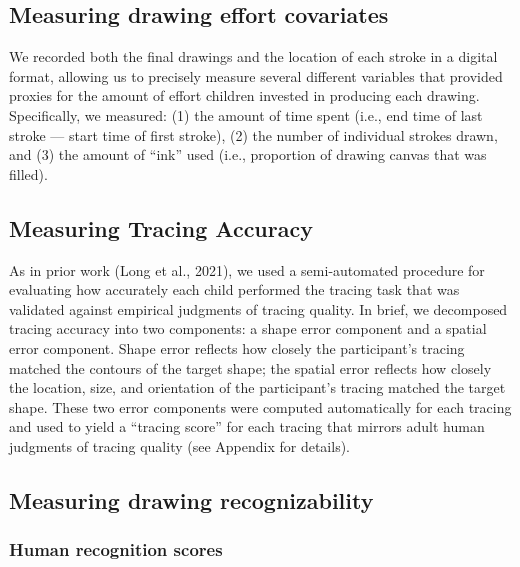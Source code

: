 \documentclass[
  english,
  man]{apa6}
\begin{document}
\hypertarget{measuring-drawing-effort-covariates}{%
\subsection{Measuring drawing effort covariates}\label{measuring-drawing-effort-covariates}}

We recorded both the final drawings and the location of each stroke in a digital format, allowing us to precisely measure several different variables that provided proxies for the amount of effort children invested in producing each drawing.
Specifically, we measured: (1) the amount of time spent (i.e., end time of last stroke --- start time of first stroke), (2) the number of individual strokes drawn, and (3) the amount of \enquote{ink} used (i.e., proportion of drawing canvas that was filled).

\hypertarget{measuring-tracing-accuracy}{%
\subsection{Measuring Tracing Accuracy}\label{measuring-tracing-accuracy}}

As in prior work (Long et al., 2021), we used a semi-automated procedure for evaluating how accurately each child performed the tracing task that was validated against empirical judgments of tracing quality. In brief, we decomposed tracing accuracy into two components: a shape error component and a spatial error component. Shape error reflects how closely the participant's tracing matched the contours of the target shape; the spatial error reflects how closely the location, size, and orientation of the participant's tracing matched the target shape. These two error components were computed automatically for each tracing and used to yield a \enquote{tracing score} for each tracing that mirrors adult human judgments of tracing quality (see Appendix for details).

\hypertarget{measuring-drawing-recognizability}{%
\subsection{Measuring drawing recognizability}\label{measuring-drawing-recognizability}}

\hypertarget{human-recognition-scores}{%
\subsubsection{Human recognition scores}\label{human-recognition-scores}}
\end{document}
